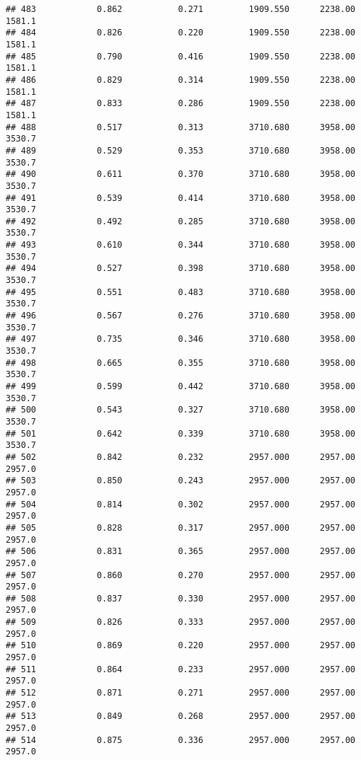 \documentclass[
]{article}
\begin{document}
\begin{verbatim}
## 483            0.862           0.271         1909.550      2238.00       1581.1
## 484            0.826           0.220         1909.550      2238.00       1581.1
## 485            0.790           0.416         1909.550      2238.00       1581.1
## 486            0.829           0.314         1909.550      2238.00       1581.1
## 487            0.833           0.286         1909.550      2238.00       1581.1
## 488            0.517           0.313         3710.680      3958.00       3530.7
## 489            0.529           0.353         3710.680      3958.00       3530.7
## 490            0.611           0.370         3710.680      3958.00       3530.7
## 491            0.539           0.414         3710.680      3958.00       3530.7
## 492            0.492           0.285         3710.680      3958.00       3530.7
## 493            0.610           0.344         3710.680      3958.00       3530.7
## 494            0.527           0.398         3710.680      3958.00       3530.7
## 495            0.551           0.483         3710.680      3958.00       3530.7
## 496            0.567           0.276         3710.680      3958.00       3530.7
## 497            0.735           0.346         3710.680      3958.00       3530.7
## 498            0.665           0.355         3710.680      3958.00       3530.7
## 499            0.599           0.442         3710.680      3958.00       3530.7
## 500            0.543           0.327         3710.680      3958.00       3530.7
## 501            0.642           0.339         3710.680      3958.00       3530.7
## 502            0.842           0.232         2957.000      2957.00       2957.0
## 503            0.850           0.243         2957.000      2957.00       2957.0
## 504            0.814           0.302         2957.000      2957.00       2957.0
## 505            0.828           0.317         2957.000      2957.00       2957.0
## 506            0.831           0.365         2957.000      2957.00       2957.0
## 507            0.860           0.270         2957.000      2957.00       2957.0
## 508            0.837           0.330         2957.000      2957.00       2957.0
## 509            0.826           0.333         2957.000      2957.00       2957.0
## 510            0.869           0.220         2957.000      2957.00       2957.0
## 511            0.864           0.233         2957.000      2957.00       2957.0
## 512            0.871           0.271         2957.000      2957.00       2957.0
## 513            0.849           0.268         2957.000      2957.00       2957.0
## 514            0.875           0.336         2957.000      2957.00       2957.0

\end{verbatim}
\end{document}
